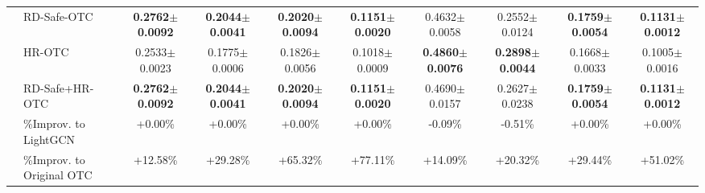 \begin{table}[t]
{\begin{tabular}{llcccccccc}
 & RD-Safe-OTC & \textbf{0.2762$\pm$0.0092} & \textbf{0.2044$\pm$0.0041} & \textbf{0.2020$\pm$0.0094} & \textbf{0.1151$\pm$0.0020} & 0.4632$\pm$0.0058 & 0.2552$\pm$0.0124 & \textbf{0.1759$\pm$0.0054} & \textbf{0.1131$\pm$0.0012}\\
 & HR-OTC & 0.2533$\pm$0.0023 & 0.1775$\pm$0.0006 & 0.1826$\pm$0.0056 & 0.1018$\pm$0.0009 & \textbf{0.4860$\pm$0.0076} & \textbf{0.2898$\pm$0.0044} & 0.1668$\pm$0.0033 & 0.1005$\pm$0.0016\\
 & RD-Safe+HR-OTC & \textbf{0.2762$\pm$0.0092} & \textbf{0.2044$\pm$0.0041} & \textbf{0.2020$\pm$0.0094} & \textbf{0.1151$\pm$0.0020} & 0.4690$\pm$0.0157 & 0.2627$\pm$0.0238 & \textbf{0.1759$\pm$0.0054} & \textbf{0.1131$\pm$0.0012}\\
 & \%Improv. to LightGCN & +0.00\% & +0.00\% & +0.00\% & +0.00\% & -0.09\% & -0.51\% & +0.00\% & +0.00\%\\
 & \%Improv. to Original OTC & +12.58\% & +29.28\% & +65.32\% & +77.11\% & +14.09\% & +20.32\% & +29.44\% & +51.02\%\\
\bottomrule
\end{tabular}%
}
\end{table}